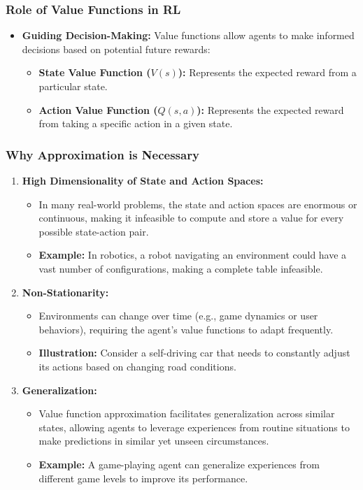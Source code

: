 \documentclass[aspectratio=169]{beamer}
\begin{document}
\begin{frame}[fragile]
    \frametitle{Role of Value Functions in RL}
    \begin{itemize}
        \item \textbf{Guiding Decision-Making:} Value functions allow agents to make informed decisions based on potential future rewards:
        \begin{itemize}
            \item \textbf{State Value Function ($V(s)$):} Represents the expected reward from a particular state.
            \item \textbf{Action Value Function ($Q(s,a)$):} Represents the expected reward from taking a specific action in a given state.
        \end{itemize}
    \end{itemize}
\end{frame}

\begin{frame}[fragile]
    \frametitle{Why Approximation is Necessary}
    \begin{enumerate}
        \item \textbf{High Dimensionality of State and Action Spaces:}
        \begin{itemize}
            \item In many real-world problems, the state and action spaces are enormous or continuous, making it infeasible to compute and store a value for every possible state-action pair.
            \item \textbf{Example:} In robotics, a robot navigating an environment could have a vast number of configurations, making a complete table infeasible.
        \end{itemize}

        \item \textbf{Non-Stationarity:}
        \begin{itemize}
            \item Environments can change over time (e.g., game dynamics or user behaviors), requiring the agent's value functions to adapt frequently.
            \item \textbf{Illustration:} Consider a self-driving car that needs to constantly adjust its actions based on changing road conditions.
        \end{itemize}

        \item \textbf{Generalization:}
        \begin{itemize}
            \item Value function approximation facilitates generalization across similar states, allowing agents to leverage experiences from routine situations to make predictions in similar yet unseen circumstances.
            \item \textbf{Example:} A game-playing agent can generalize experiences from different game levels to improve its performance.
        \end{itemize}
    \end{enumerate}
\end{frame}
\end{document}
